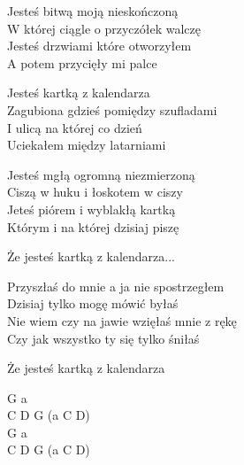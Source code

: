 \begin{textn}
    Jesteś bitwą moją nieskończoną\\
    W której ciągle o przyczółek walczę\\ 
    Jesteś drzwiami które otworzyłem\\
    A potem przycięły mi palce

    \vin Jesteś kartką z kalendarza\\
    \vin Zagubiona gdzieś pomiędzy szufladami\\
    \vin I ulicą na której co dzień\\
    \vin Uciekałem między latarniami

    Jesteś mgłą ogromną niezmierzoną\\
    Ciszą w huku i łoskotem w ciszy\\
    Jeteś piórem i wyblakłą kartką\\
    Którym i na której dzisiaj piszę

    \vin Że jesteś kartką z kalendarza...
 
    Przyszłaś do mnie a ja nie spostrzegłem\\
    Dzisiaj tylko mogę mówić byłaś\\
    Nie wiem czy na jawie wzięłaś mnie z rękę\\ 
    Czy jak wszystko ty się tylko śniłaś

    \vin Że jesteś kartką z kalendarza
\end{textn}
\begin{chordw}
    G a\\
    C D G (a C D)\\    
    G a\\
    C D G (a C D)
\end{chordw}